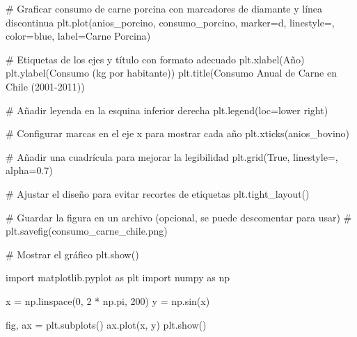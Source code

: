 \documentclass[
  jou,
  floatsintext,
  longtable,
  a4paper,
  nolmodern,
  notxfonts,
  notimes,
  colorlinks=true,linkcolor=blue,citecolor=blue,urlcolor=blue]{apa7}
\newenvironment{Shaded}{\begin{snugshade}}{\end{snugshade}}
\newcommand{\CommentTok}[1]{\textcolor[rgb]{0.37,0.37,0.37}{#1}}
\newcommand{\DecValTok}[1]{\textcolor[rgb]{0.68,0.00,0.00}{#1}}
\newcommand{\FloatTok}[1]{\textcolor[rgb]{0.68,0.00,0.00}{#1}}
\newcommand{\ImportTok}[1]{\textcolor[rgb]{0.00,0.46,0.62}{#1}}
\newcommand{\NormalTok}[1]{\textcolor[rgb]{0.00,0.23,0.31}{#1}}
\newcommand{\OperatorTok}[1]{\textcolor[rgb]{0.37,0.37,0.37}{#1}}
\newcommand{\StringTok}[1]{\textcolor[rgb]{0.13,0.47,0.30}{#1}}
\newcommand{\VariableTok}[1]{\textcolor[rgb]{0.07,0.07,0.07}{#1}}
\begin{document}
\begin{Shaded}
\begin{Highlighting}[]
\CommentTok{\# Graficar consumo de carne porcina con marcadores de diamante y línea discontinua}
\NormalTok{plt.plot(anios\_porcino, consumo\_porcino, marker}\OperatorTok{=}\StringTok{\textquotesingle{}d\textquotesingle{}}\NormalTok{, linestyle}\OperatorTok{=}\StringTok{\textquotesingle{}{-}{-}\textquotesingle{}}\NormalTok{, color}\OperatorTok{=}\StringTok{\textquotesingle{}blue\textquotesingle{}}\NormalTok{, label}\OperatorTok{=}\StringTok{\textquotesingle{}Carne Porcina\textquotesingle{}}\NormalTok{)}

\CommentTok{\# Etiquetas de los ejes y título con formato adecuado}
\NormalTok{plt.xlabel(}\StringTok{\textquotesingle{}Año\textquotesingle{}}\NormalTok{)}
\NormalTok{plt.ylabel(}\StringTok{\textquotesingle{}Consumo (kg por habitante)\textquotesingle{}}\NormalTok{)}
\NormalTok{plt.title(}\StringTok{\textquotesingle{}Consumo Anual de Carne en Chile (2001{-}2011)\textquotesingle{}}\NormalTok{)}

\CommentTok{\# Añadir leyenda en la esquina inferior derecha}
\NormalTok{plt.legend(loc}\OperatorTok{=}\StringTok{\textquotesingle{}lower right\textquotesingle{}}\NormalTok{)}

\CommentTok{\# Configurar marcas en el eje x para mostrar cada año}
\NormalTok{plt.xticks(anios\_bovino)}

\CommentTok{\# Añadir una cuadrícula para mejorar la legibilidad}
\NormalTok{plt.grid(}\VariableTok{True}\NormalTok{, linestyle}\OperatorTok{=}\StringTok{\textquotesingle{}{-}{-}\textquotesingle{}}\NormalTok{, alpha}\OperatorTok{=}\FloatTok{0.7}\NormalTok{)}

\CommentTok{\# Ajustar el diseño para evitar recortes de etiquetas}
\NormalTok{plt.tight\_layout()}

\CommentTok{\# Guardar la figura en un archivo (opcional, se puede descomentar para usar)}
\CommentTok{\# plt.savefig(\textquotesingle{}consumo\_carne\_chile.png\textquotesingle{})}

\CommentTok{\# Mostrar el gráfico}
\NormalTok{plt.show()}
\end{Highlighting}
\end{Shaded}

\begin{Shaded}
\begin{Highlighting}[]
\ImportTok{import}\NormalTok{ matplotlib.pyplot }\ImportTok{as}\NormalTok{ plt}
\ImportTok{import}\NormalTok{ numpy }\ImportTok{as}\NormalTok{ np}

\NormalTok{x }\OperatorTok{=}\NormalTok{ np.linspace(}\DecValTok{0}\NormalTok{, }\DecValTok{2} \OperatorTok{*}\NormalTok{ np.pi, }\DecValTok{200}\NormalTok{)}
\NormalTok{y }\OperatorTok{=}\NormalTok{ np.sin(x)}

\NormalTok{fig, ax }\OperatorTok{=}\NormalTok{ plt.subplots()}
\NormalTok{ax.plot(x, y)}
\NormalTok{plt.show()}
\end{Highlighting}
\end{Shaded}
\end{document}
